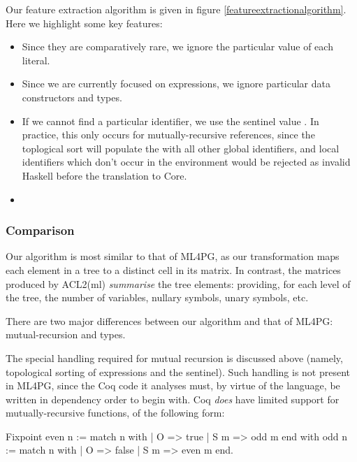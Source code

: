 Our feature extraction algorithm is given in figure \ref{featureextractionalgorithm}. Here we highlight some key features:

\begin{itemize}
  \item Since they are comparatively rare, we ignore the particular value of each literal.
  \item Since we are currently focused on expressions, we ignore particular data constructors and types.
  \item If we cannot find a particular identifier, we use the sentinel value . In practice, this only occurs for mutually-recursive references, since the toplogical sort will populate the  with all other global identifiers, and local identifiers which don't occur in the environment would be rejected as invalid Haskell before the translation to Core.
  \item
\end{itemize}

\subsubsection{Comparison}

Our algorithm is most similar to that of ML4PG, as our transformation maps each element in a tree to a distinct cell in its matrix. In contrast, the matrices produced by ACL2(ml) \emph{summarise} the tree elements: providing, for each level of the tree, the number of variables, nullary symbols, unary symbols, etc.

There are two major differences between our algorithm and that of ML4PG: mutual-recursion and types.

The special handling required for mutual recursion is discussed above (namely, topological sorting of expressions and the  sentinel). Such handling is not present in ML4PG, since the Coq code it analyses must, by virtue of the language, be written in dependency order to begin with. Coq \emph{does} have limited support for mutually-recursive functions, of the following form:

\begin{coqblock}
Fixpoint even n := match n with
                       | O   => true
                       | S m => odd m
                   end
    with odd  n := match n with
                       | O   => false
                       | S m => even m
                   end.
\end{coqblock}

